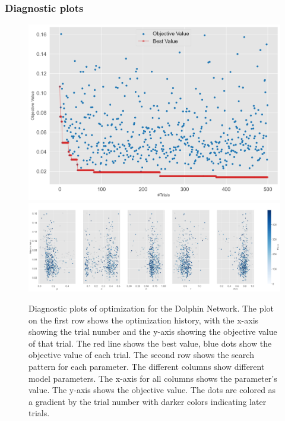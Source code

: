 \documentclass[11pt]{article}
\begin{document}
\subsubsection{Diagnostic plots}
\begin{figure}[H]
    \centering
    \includegraphics[width=.7\linewidth]{../plots/overall/Optimization_History_dolphin.png}
    \includegraphics[width=.7\linewidth]{../plots/overall/Plot_Slice_dolphin.png}
  \caption{Diagnostic plots of optimization for the Dolphin Network. The plot on the first row shows the optimization history, with the x-axis showing the trial number and the y-axis showing the objective value of that trial. The red line shows the best value, blue dots show the objective value of each trial. The second row shows the search pattern for each parameter. The different columns show different model parameters. The x-axis for all columns shows the parameter's value. The y-axis shows the objective value. The dots are colored as a gradient by the trial number with darker colors indicating later trials.}
  \label{appendix:optimization_dolphin}
\end{figure}
\end{document}
